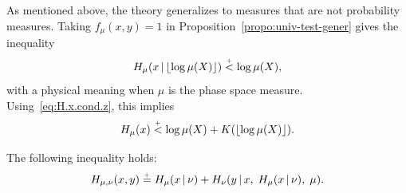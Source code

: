 As mentioned above, the
theory generalizes to measures that are not probability measures.
Taking $f_{\mu}(x,y)=1$ in Proposition~\ref{propo:univ-test-gener} gives
the inequality
 \[
   H_{\mu}(x \,\vert\, {\lfloor \log \mu(X)\rfloor}) \stackrel{{}_+}{<} \log\mu(X),
 \]
with a physical meaning when $\mu$ is the phase space measure.
Using~\eqref{eq:H.x.cond.z}, this implies
 \begin{equation}\label{eq:unif.ub}
  H_\mu(x)\stackrel{{}_+}{<} \log\mu(X) + K({\lfloor \log\mu(X)\rfloor}).
  \end{equation}

 \begin{theorem}\label{thm:addition-general}
The following inequality holds:
 \[
   H_{\mu,\nu}(x,y) \stackrel{{}_+}{=}
  H_{\mu}(x \,\vert\, \nu)+ H_{\nu}(y \,\vert\, x,\; H_\mu(x \,\vert\, \nu),\; \mu).
 \]
 \end{theorem}

